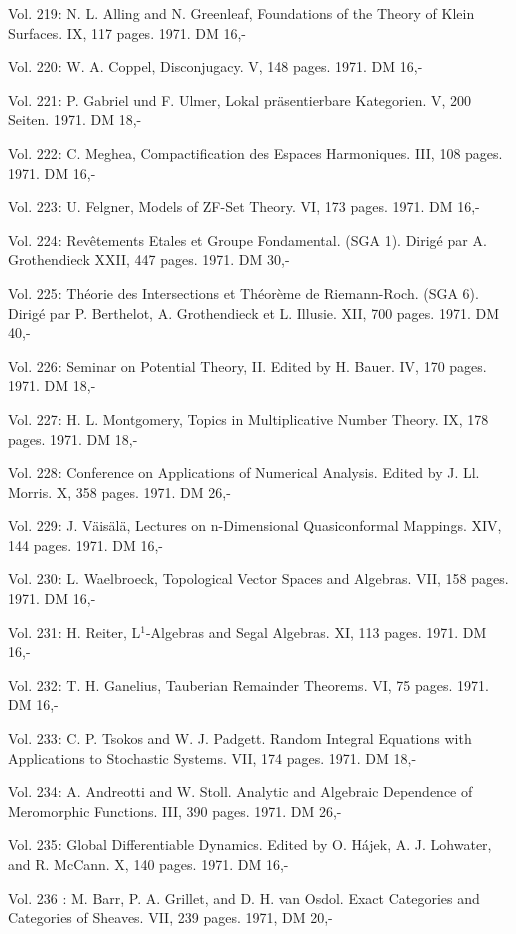 Vol. 219: N. L. Alling and N. Greenleaf, Foundations of the Theory of Klein Surfaces. IX, 117 pages. 1971. DM 16,-

Vol. 220: W. A. Coppel, Disconjugacy. V, 148 pages. 1971. DM 16,-

Vol. 221: P. Gabriel und F. Ulmer, Lokal präsentierbare Kategorien. V, 200 Seiten. 1971. DM 18,-

Vol. 222: C. Meghea, Compactification des Espaces Harmoniques. III, 108 pages. 1971. DM 16,-

Vol. 223: U. Felgner, Models of ZF-Set Theory. VI, 173 pages. 1971. DM 16,-

Vol. 224: Revêtements Etales et Groupe Fondamental. (SGA 1). Dirigé par A. Grothendieck XXII, 447 pages. 1971. DM 30,-

Vol. 225: Théorie des Intersections et Théorème de Riemann-Roch. (SGA 6). Dirigé par P. Berthelot, A. Grothendieck et L. Illusie. XII, 700 pages. 1971. DM 40,-

Vol. 226: Seminar on Potential Theory, II. Edited by H. Bauer. IV, 170 pages. 1971. DM 18,-

Vol. 227: H. L. Montgomery, Topics in Multiplicative Number Theory. IX, 178 pages. 1971. DM 18,-

Vol. 228: Conference on Applications of Numerical Analysis. Edited by J. Ll. Morris. X, 358 pages. 1971. DM 26,-

Vol. 229: J. Väisälä, Lectures on n-Dimensional Quasiconformal Mappings. XIV, 144 pages. 1971. DM 16,-

Vol. 230: L. Waelbroeck, Topological Vector Spaces and Algebras. VII, 158 pages. 1971. DM 16,-

Vol. 231: H. Reiter, L$^1$-Algebras and Segal Algebras. XI, 113 pages. 1971. DM 16,-

Vol. 232: T. H. Ganelius, Tauberian Remainder Theorems. VI, 75 pages. 1971. DM 16,-

Vol. 233: C. P. Tsokos and W. J. Padgett. Random Integral Equations with Applications to Stochastic Systems. VII, 174 pages. 1971. DM 18,-

Vol. 234: A. Andreotti and W. Stoll. Analytic and Algebraic Dependence of Meromorphic Functions. III, 390 pages. 1971. DM 26,-

Vol. 235: Global Differentiable Dynamics. Edited by O. Hájek, A. J. Lohwater, and R. McCann. X, 140 pages. 1971. DM 16,-

Vol. 236 : M. Barr, P. A. Grillet, and D. H. van Osdol. Exact Categories and Categories of Sheaves. VII, 239 pages. 1971, DM 20,-

